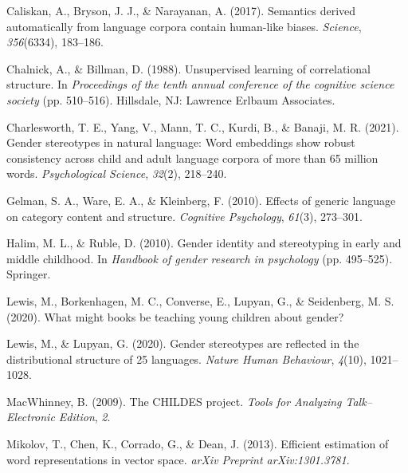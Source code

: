\documentclass[10pt, letterpaper]{article}
\newenvironment{CSLReferences}%
  {}%
  {\par}
\begin{document}
\hypertarget{refs}{}
\begin{CSLReferences}{1}{0}
\leavevmode{}%
Caliskan, A., Bryson, J. J., \& Narayanan, A. (2017). Semantics derived
automatically from language corpora contain human-like biases.
\emph{Science}, \emph{356}(6334), 183--186.

\leavevmode{}%
Chalnick, A., \& Billman, D. (1988). Unsupervised learning of
correlational structure. In \emph{Proceedings of the tenth annual
conference of the cognitive science society} (pp. 510--516). Hillsdale,
NJ: Lawrence Erlbaum Associates.

\leavevmode{}%
Charlesworth, T. E., Yang, V., Mann, T. C., Kurdi, B., \& Banaji, M. R.
(2021). Gender stereotypes in natural language: Word embeddings show
robust consistency across child and adult language corpora of more than
65 million words. \emph{Psychological Science}, \emph{32}(2), 218--240.

\leavevmode{}%
Gelman, S. A., Ware, E. A., \& Kleinberg, F. (2010). Effects of generic
language on category content and structure. \emph{Cognitive Psychology},
\emph{61}(3), 273--301.

\leavevmode{}%
Halim, M. L., \& Ruble, D. (2010). Gender identity and stereotyping in
early and middle childhood. In \emph{Handbook of gender research in
psychology} (pp. 495--525). Springer.

\leavevmode{}%
Lewis, M., Borkenhagen, M. C., Converse, E., Lupyan, G., \& Seidenberg,
M. S. (2020). What might books be teaching young children about gender?

\leavevmode{}%
Lewis, M., \& Lupyan, G. (2020). Gender stereotypes are reflected in the
distributional structure of 25 languages. \emph{Nature Human Behaviour},
\emph{4}(10), 1021--1028.

\leavevmode{}%
MacWhinney, B. (2009). The CHILDES project. \emph{Tools for Analyzing
Talk--Electronic Edition}, \emph{2}.

\leavevmode{}%
Mikolov, T., Chen, K., Corrado, G., \& Dean, J. (2013). Efficient
estimation of word representations in vector space. \emph{arXiv Preprint
arXiv:1301.3781}.


\end{CSLReferences}
\end{document}
